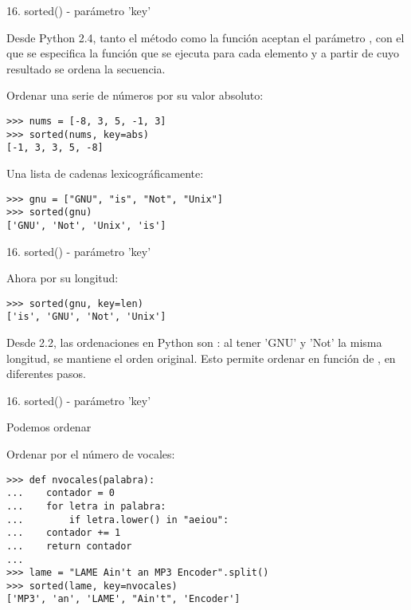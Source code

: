 \begin{frame}[fragile]{16. sorted() - parámetro 'key'}
  \footnotesize
  \begin{block}{}
    \centering
    Desde Python 2.4, tanto el método  como la
    función  aceptan el parámetro ,
    con el que se especifica la función que se ejecuta para cada
    elemento y a partir de cuyo resultado se ordena la secuencia.
  \end{block}

  \begin{exampleblock}
    {Ordenar una serie de números por su valor absoluto:}
    \begin{lstlisting}
>>> nums = [-8, 3, 5, -1, 3]
>>> sorted(nums, key=abs)
[-1, 3, 3, 5, -8]
    \end{lstlisting}
  \end{exampleblock}

  \begin{exampleblock}
    {Una lista de cadenas lexicográficamente:}
    \begin{lstlisting}
>>> gnu = ["GNU", "is", "Not", "Unix"]
>>> sorted(gnu)
['GNU', 'Not', 'Unix', 'is']
    \end{lstlisting}
  \end{exampleblock}
\end{frame}

\begin{frame}[fragile]{16. sorted() - parámetro 'key'}
  \begin{exampleblock}
    {Ahora por su longitud:}
    \begin{lstlisting}
>>> sorted(gnu, key=len)
['is', 'GNU', 'Not', 'Unix']
    \end{lstlisting}
  \end{exampleblock}

  \begin{alertblock}{}
    \centering
    Desde 2.2, las ordenaciones en Python son : al
    tener 'GNU' y 'Not' la misma longitud, se mantiene el orden
    original. Esto permite ordenar en función de , en diferentes pasos.
  \end{alertblock}
\end{frame}

\begin{frame}[fragile]{16. sorted() - parámetro 'key'}
  \begin{block}{}
    \centering
    Podemos ordenar 
  \end{block}

  \footnotesize
  \begin{exampleblock}
    {Ordenar por el número de vocales:}
    \begin{lstlisting}
>>> def nvocales(palabra):
...    contador = 0
...    for letra in palabra:
...        if letra.lower() in "aeiou":
...	   contador += 1
...    return contador
...
>>> lame = "LAME Ain't an MP3 Encoder".split()
>>> sorted(lame, key=nvocales)
['MP3', 'an', 'LAME', "Ain't", 'Encoder']
    \end{lstlisting}
  \end{exampleblock}
\end{frame}

